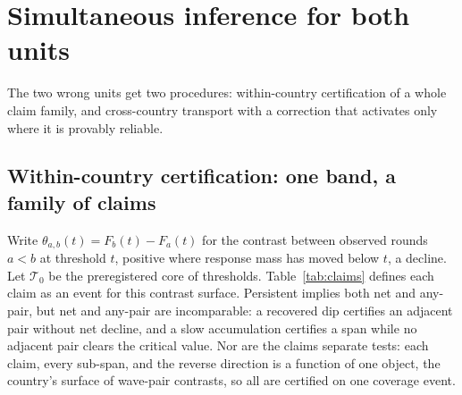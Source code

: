 \section{Simultaneous inference for both units}\label{sec:method}

The two wrong units get two procedures: within-country certification of a
whole claim family, and cross-country transport with a correction that
activates only where it is provably reliable.

\subsection{Within-country certification: one band, a family of claims}
\label{sec:claims}

Write
$\theta_{a,b}(t)=F_b(t)-F_a(t)$ for the contrast between observed rounds
$a<b$ at threshold $t$, positive where response mass has moved below $t$, a
decline. Let $\mathcal T_0$ be the
preregistered core of thresholds. Table~\ref{tab:claims} defines each claim
as an event for this contrast surface. Persistent implies both net and any-pair, but net and any-pair are
incomparable: a recovered dip certifies an adjacent pair without net
decline, and a slow accumulation certifies a span while no adjacent pair
clears the critical value. Nor are the claims separate tests: each claim,
every sub-span, and the reverse direction is a function of one object, the
country's surface of wave-pair contrasts, so all are certified on one
coverage event.

